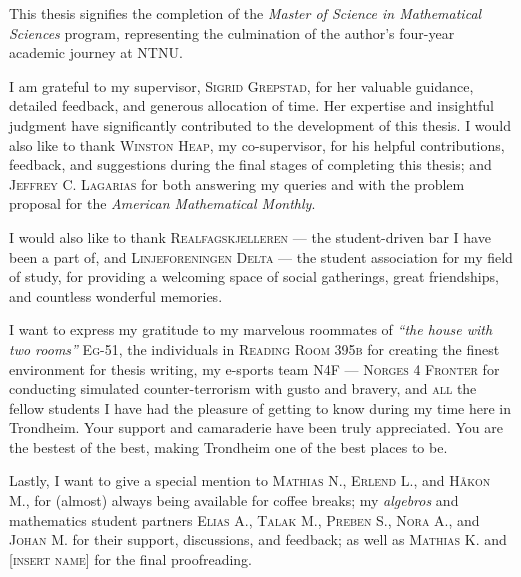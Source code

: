 




\vspace{.25in}

This thesis signifies the completion of the \textit{Master of Science in Mathematical Sciences} program, representing the culmination of the author's four-year academic journey at NTNU.

I am grateful to my supervisor, \textsc{Sigrid Grepstad}, for her valuable guidance, detailed feedback, and generous allocation of time. Her expertise and insightful judgment have significantly contributed to the development of this thesis. I would also like to thank \textsc{Winston Heap}, my co-supervisor, for his helpful contributions, feedback, and suggestions during the final stages of completing this thesis; and \textsc{Jeffrey C. Lagarias} for both answering my queries and with the problem proposal for the \emph{American Mathematical Monthly}.   

I would also like to thank \textsc{Realfagskjelleren} — the student-driven bar I have been a part of, and \textsc{Linjeforeningen Delta} — the student association for my field of study, for providing a welcoming space of social gatherings, great friendships, and countless wonderful memories. 

I want to express my gratitude to my marvelous roommates of \emph{\enquote{the house with two rooms}} \textsc{Eg-51}, the individuals in \textsc{Reading Room 395b} for creating the finest environment for thesis writing, my e-sports team \textsc{N4F — Norges 4 Fronter} for conducting simulated counter-terrorism with gusto and bravery, and \textsc{all} the fellow students I have had the pleasure of getting to know during my time here in Trondheim. Your support and camaraderie have been truly appreciated. You are the bestest of the best, making Trondheim one of the best places to be. 

Lastly, I want to give a special mention to \textsc{Mathias N.}, \textsc{Erlend L.}, and \textsc{Håkon M.}, for (almost) always being available for coffee breaks; my \emph{algebros} and mathematics student partners \textsc{Elias A.}, \textsc{Talak M.}, \textsc{Preben S.}, \textsc{Nora A.}, and \textsc{Johan M.} for their support, discussions, and feedback; as well as \textsc{Mathias K.} and \textsc{[insert name]} for the final proofreading.


